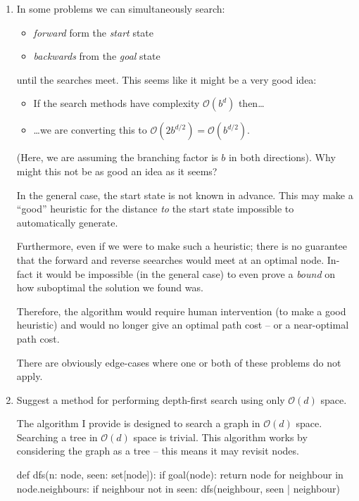 \documentclass[10pt,\jkfside,a4paper]{article}
\begin{document}
\begin{enumerate}
\item In some problems we can simultaneously search:
\begin{itemize}

\item \textit{forward} form the \textit{start} state

\item \textit{backwards} from the \textit{goal} state

\end{itemize}
until the searches meet. This seems like it might be a very good idea:
\begin{itemize}

\item If the search methods have complexity $\mathcal O\left(b^d\right)$
then\ldots

\item \ldots we are converting this to $\mathcal O\left( 2 b^{d/2} \right) =
\mathcal O\left( b^{d/2} \right) $.

\end{itemize}
(Here, we are assuming the branching factor is $b$ in both directions). Why
might this not be as good an idea as it seems?

In the general case, the start state is not known in advance. This may
make a ``good'' heuristic for the distance \textit{to} the start state
impossible to automatically generate.

Furthermore, even if we were to make such a heuristic; there is no guarantee
that the forward and reverse seearches would meet at an optimal node.
In-fact it would be impossible (in the general case) to even prove a
\textit{bound} on how suboptimal the solution we found was.

Therefore, the algorithm would require human intervention (to make a good
heuristic) and would no longer give an optimal path cost -- or a
near-optimal path cost.

There are obviously edge-cases where one or both of these problems do not
apply.

\item Suggest a method for performing depth-first search using only
$\mathcal O(d)$ space.

The algorithm I provide is designed to search a graph in $\mathcal O(d)$
space. Searching a tree in $\mathcal O(d)$ space is trivial. This algorithm
works by considering the graph as a tree -- this means it may revisit nodes.

\begin{python}
def dfs(n: node, seen: set[node]):
	if goal(node):
		return node
	for neighbour in node.neighbours:
		if neighbour not in seen:
			dfs(neighbour, seen | {neighbour})
\end{python}


\end{enumerate}
\end{document}

